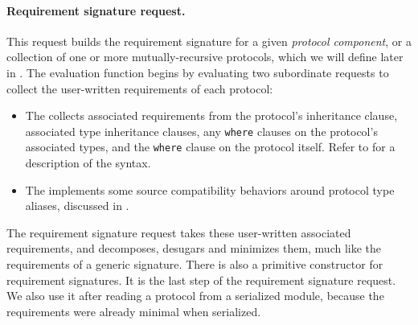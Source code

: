 \documentclass[../generics]{subfiles}
\begin{document}
\paragraph{Requirement signature request.} This request builds the requirement signature for a given \emph{protocol component}, or a collection of one or more mutually-recursive protocols, which we will define later in . The evaluation function begins by evaluating two subordinate requests to collect the user-written requirements of each protocol:
\begin{itemize}
\item The  collects associated requirements from the protocol’s inheritance clause, associated type inheritance clauses, any \texttt{where} clauses on the protocol’s associated types, and the \texttt{where} clause on the protocol itself. Refer to  for a description of the syntax.
\item The  implements some source compatibility behaviors around protocol type aliases, discussed in .
\end{itemize}
The requirement signature request takes these user-written associated requirements, and decomposes, desugars and minimizes them, much like the requirements of a generic signature. There is also a primitive constructor for requirement signatures. It is the last step of the requirement signature request. We also use it after reading a protocol from a serialized module, because the requirements were already minimal when serialized.
\end{document}
